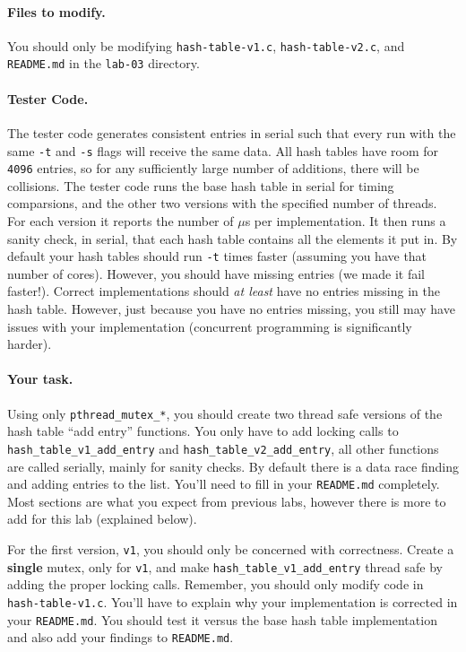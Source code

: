 \paragraph{Files to modify.}

You should only be modifying \texttt{hash-table-v1.c}, \texttt{hash-table-v2.c},
and \texttt{README.md} in the \texttt{lab-03} directory.

\paragraph{Tester Code.}

The tester code generates consistent entries in serial such that every run
with the same \texttt{-t} and \texttt{-s} flags will receive the same data.
All hash tables have room for \texttt{4096} entries, so for any sufficiently
large number of additions, there will be collisions.
The tester code runs the base hash table in serial for timing comparsions,
and the other two versions with the specified number of threads.
For each version it reports the number of $\mu$s per implementation.
It then runs a sanity check, in serial, that each hash table contains all
the elements it put in.
By default your hash tables should run \texttt{-t} times faster (assuming you
have that number of cores).
However, you should have missing entries (we made it fail faster!).
Correct implementations should \textit{at least} have no entries missing in
the hash table.
However, just because you have no entries missing, you still may have issues
with your implementation (concurrent programming is significantly harder).

\paragraph{Your task.}

Using only \texttt{pthread\_mutex\_*}, you should create two thread safe
versions of the hash table ``add entry'' functions.
You only have to add locking calls to \texttt{hash\_table\_v1\_add\_entry}
and \texttt{hash\_table\_v2\_add\_entry}, all other functions are called
serially, mainly for sanity checks.
By default there is a data race finding and adding entries to the list.
You'll need to fill in your \texttt{README.md} completely.
Most sections are what you expect from previous labs, however there is more
to add for this lab (explained below).

For the first version, \texttt{v1}, you should only be concerned with
correctness.
Create a \textbf{single} mutex, only for \texttt{v1}, and make 
\texttt{hash\_table\_v1\_add\_entry} thread safe by adding the proper locking
calls.
Remember, you should only modify code in \texttt{hash-table-v1.c}.
You'll have to explain why your implementation is corrected in your
\texttt{README.md}.
You should test it versus the base hash table implementation and also add your
findings to \texttt{README.md}.

